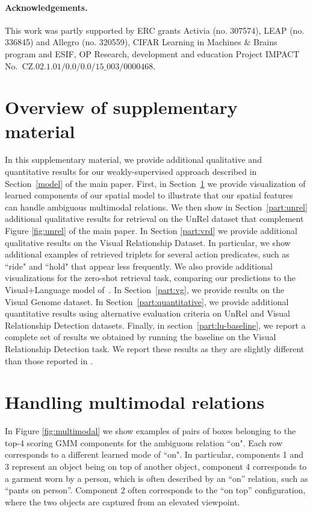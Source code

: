 \documentclass[10pt,twocolumn,letterpaper]{article}
\begin{document}
\paragraph{Acknowledgements.}
\small{This work was partly supported by ERC grants Activia (no. 307574),
LEAP (no. 336845) and Allegro (no. 320559), CIFAR Learning in Machines \& Brains program and ESIF, OP Research, development and education Project IMPACT
No.\ CZ$.02.1.01/0.0/0.0/15\_003/0000468$.}

{\small


}




\clearpage

\appendix



\section*{Overview of supplementary material}
In this supplementary material, we provide additional qualitative and quantitative results for our weakly-supervised approach described in Section~\ref{model} of the main paper. First, in Section~\ref{part:multimodal} we provide visualization of learned components of our spatial model to illustrate that our spatial features can handle ambiguous multimodal relations. We then show in Section~\ref{part:unrel} additional qualitative results for retrieval on the UnRel dataset that complement Figure \ref{fig:unrel} of the main paper. In Section \ref{part:vrd} we provide additional qualitative results on the Visual Relationship Dataset. In particular, we show additional examples of retrieved triplets for several action predicates, such as ``ride" and ``hold" that appear less frequently. We also provide additional visualizations for the zero-shot retrieval task, comparing our predictions to the Visual+Language model of~\cite{Lu16}. In Section~\ref{part:vg}, we provide results on the Visual Genome dataset. In Section~\ref{part:quantitative}, we provide additional quantitative results using alternative evaluation criteria  on UnRel and Visual Relationship Detection datasets. 
Finally, in section~\ref{part:lu-baseline}, we report a complete set of results we obtained by running the baseline \cite{Lu16} on the Visual Relationship Detection task. We report these results as they are slightly different than those reported in \cite{Lu16}.



\section{Handling multimodal relations}
\label{part:multimodal}
In Figure \ref{fig:multimodal} we show examples of pairs of boxes belonging to the top-4 scoring GMM components for the ambiguous relation ``on". Each row corresponds to a different learned mode of ``on". In particular, components 1 and 3 represent an object being on top of another object, component 4 corresponds to a garment worn by a person, which is often described by an ``on'' relation, such as ``pants on person''. Component 2 often corresponds to the ``on top'' configuration, where the two objects are captured from an elevated viewpoint. 
\end{document}
